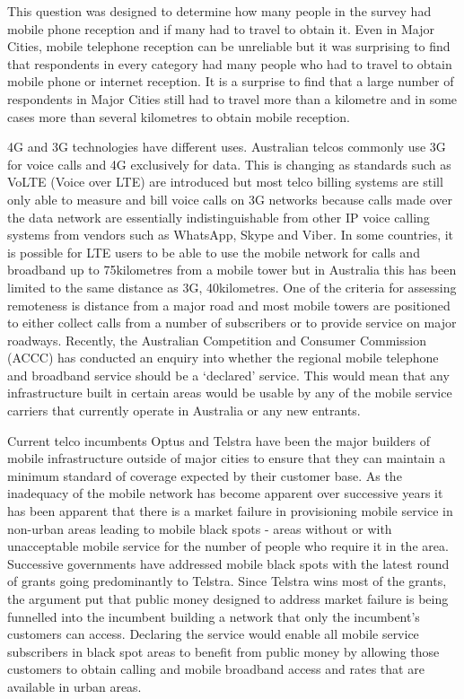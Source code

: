This question was designed to determine how many people in the survey had mobile phone reception and if many had to travel to obtain it. Even in Major Cities, mobile telephone reception can be unreliable but it was surprising to find that respondents in every category had many people who had to travel to obtain mobile phone or internet reception. It is a surprise to find that a large number of respondents in Major Cities still had to travel more than a kilometre and in some cases more than several kilometres to obtain mobile reception.

4G and 3G technologies have different uses. Australian telcos commonly use 3G for voice calls and 4G exclusively for data. This is changing as standards such as VoLTE (Voice over LTE) are introduced but most telco billing systems are still only able to measure and bill voice calls on 3G networks because calls made over the data network are essentially indistinguishable from other IP voice calling systems from vendors such as WhatsApp, Skype and Viber. In some countries, it is possible for LTE users to be able to use the mobile network for calls and broadband up to 75kilometres from a mobile tower but in Australia this has been limited to the same distance as 3G, 40kilometres. One of the criteria for assessing remoteness is distance from a major road and most mobile towers are positioned to either collect calls from a number of subscribers or to provide service on major roadways. Recently, the Australian Competition and Consumer Commission (ACCC) has conducted an enquiry into whether the regional mobile telephone and broadband service should be a `declared' service. This would mean that any infrastructure built in certain areas would be usable by any of the mobile service carriers that currently operate in Australia or any new entrants.

Current telco incumbents Optus and Telstra have been the major builders of mobile infrastructure outside of major cities to ensure that they can maintain a minimum standard of coverage expected by their customer base. As the inadequacy of the mobile network has become apparent over successive years it has been apparent that there is a market failure in provisioning mobile service in non-urban areas leading to mobile black spots - areas without or with unacceptable mobile service for the number of people who require it in the area. Successive governments have addressed mobile black spots with the latest round of grants going predominantly to Telstra.\cite{Battersby} Since Telstra wins most of the grants, the argument put that public money designed to address market failure is being funnelled into the incumbent building a network that only the incumbent's customers can access. Declaring the service would enable all mobile service subscribers in black spot areas to benefit from public money by allowing those customers to obtain calling and mobile broadband access and rates that are available in urban areas. 

